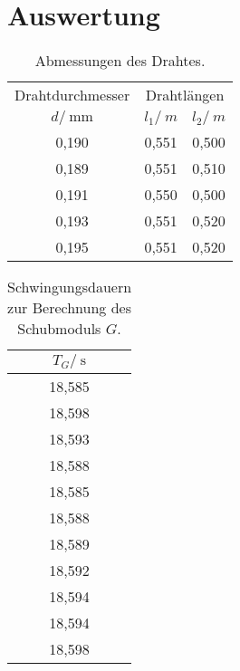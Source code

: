\newpage
\section{Auswertung}
\label{sec:Auswertung}


\begin{table}
	\centering
	\begin{tabular}{c cc}
	\toprule
	{Drahtdurchmesser} & \multicolumn{2}{c}{Drahtlängen} \\
	{$d/\:\si{\milli\meter}$} & {$l_1/\:\si{m}$} & {$l_2/\:\si{m}$}\\
	\midrule
0,190 & 0,551 & 0,500 \\
0,189 & 0,551 & 0,510 \\
0,191 & 0,550 & 0,500 \\
0,193 & 0,551 & 0,520 \\
0,195 & 0,551 & 0,520 \\
	\bottomrule
	\end{tabular}
	\caption{Abmessungen des Drahtes.}
	\label{tab:draht}
\end{table}

\begin{table}
	\centering
	\begin{tabular}{c}
	\toprule
	{$T_G/\:\si{\second}$}\\
	\midrule
18,585\\
18,598\\
18,593\\
18,588\\
18,585\\
18,588\\
18,589\\
18,592\\
18,594\\
18,594\\
18,598\\
	\bottomrule
	\end{tabular}
	\caption{Schwingungsdauern zur Berechnung des Schubmoduls $G$.}
	\label{tab:T_G}
\end{table}

